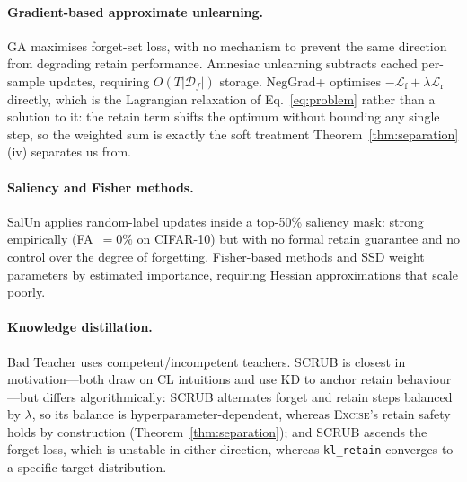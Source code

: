 \documentclass{article}
\newcommand{\ours}{\textsc{Excise}}
\newcommand{\klr}{\texttt{kl\_retain}}
\newcommand{\Df}{\mathcal{D}_f}
\newcommand{\lossf}{\mathcal{L}_{\mathrm{f}}}
\newcommand{\lossr}{\mathcal{L}_{\mathrm{r}}}
\theoremstyle{remark}
\theoremstyle{plain}
\begin{document}
\paragraph{Gradient-based approximate unlearning.}
GA \citep{thudi2022unrolling} maximises forget-set loss, with no mechanism to
prevent the same direction from degrading retain performance. Amnesiac
unlearning \citep{graves2021amnesiac} subtracts cached per-sample updates,
requiring $O(T|\Df|)$ storage. NegGrad+ optimises
$-\lossf + \lambda\lossr$ directly, which is the Lagrangian relaxation of
Eq.~\ref{eq:problem} rather than a solution to it: the retain term shifts the
optimum without bounding any single step, so the weighted sum is exactly the
soft treatment Theorem~\ref{thm:separation}(iv) separates us from.

\paragraph{Saliency and Fisher methods.}
SalUn \citep{fan2024salun} applies random-label updates inside a top-50\%
saliency mask: strong empirically (FA~$=0\%$ on CIFAR-10) but with no formal
retain guarantee and no control over the degree of forgetting. Fisher-based
methods \citep{golatkar2020eternal,golatkar2021scrubbing} and SSD
\citep{foster2024ssd} weight parameters by estimated importance, requiring
Hessian approximations that scale poorly.

\paragraph{Knowledge distillation.}
Bad Teacher \citep{chundawat2023badteacher} uses competent/incompetent teachers.
SCRUB \citep{kurmanji2023unbounded} is closest in motivation---both draw on CL
intuitions and use KD to anchor retain behaviour---but differs algorithmically:
SCRUB alternates forget and retain steps balanced by $\lambda$, so its balance is
hyperparameter-dependent, whereas \ours{}'s retain safety holds by construction
(Theorem~\ref{thm:separation}); and SCRUB ascends the forget loss, which is
unstable in either direction, whereas \klr{} converges to a specific target
distribution.
\end{document}

